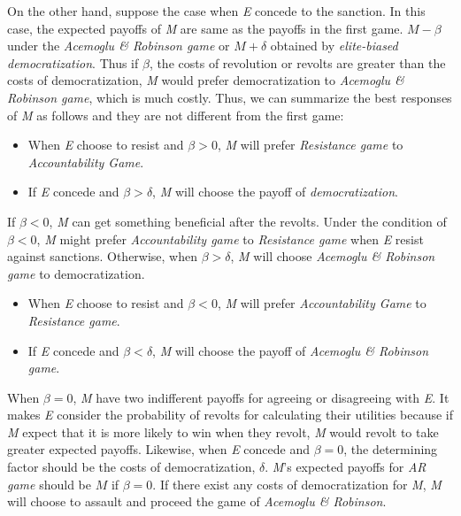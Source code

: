 \documentclass[11pt, letterpage, titlepage]{article}
\begin{document}
On the other hand, suppose the case when \textit{E} concede to the sanction. In this case, the expected payoffs of \textit{M} are same as the payoffs in the first game. $M-\beta$ under the \textit{Acemoglu \& Robinson game} or $M + \delta$ obtained by \textit{elite-biased democratization}. Thus if $\beta$, the costs of revolution or revolts are greater than the costs of democratization, \textit{M} would prefer democratization to \textit{Acemoglu \& Robinson game}, which is much costly. Thus, we can summarize the best responses of \textit{M} as follows and they are not different from the first game:
	
\begin{itemize}
	\item When \textit{E} choose to resist and $\beta > 0$, \textit{M} will prefer \textit{Resistance game} to \textit{Accountability Game}.
	\item If \textit{E} concede and $\beta > \delta$, \textit{M} will choose the payoff of \textit{democratization}.
\end{itemize}
	
If $\beta < 0$, \textit{M} can get something beneficial after the revolts. Under the condition of $\beta < 0$, \textit{M} might prefer \textit{Accountability game} to \textit{Resistance game} when \textit{E} resist against sanctions. Otherwise, when $\beta > \delta$, \textit{M} will choose \textit{Acemoglu \& Robinson game} to democratization. 

\begin{itemize}
	\item When \textit{E} choose to resist and $\beta < 0$, \textit{M} will prefer \textit{Accountability Game} to \textit{Resistance game}.
	\item If \textit{E} concede and $\beta < \delta$, \textit{M} will choose the payoff of \textit{Acemoglu \& Robinson game}.
\end{itemize}
	
When $\beta = 0$, \textit{M} have two indifferent payoffs for agreeing or disagreeing with \textit{E}. It makes \textit{E} consider the probability of revolts for calculating their utilities because if \textit{M} expect that it is more likely to win when they revolt, \textit{M} would revolt to take greater expected payoffs.    Likewise, when \textit{E} concede and $\beta = 0$, the determining factor should be the costs of democratization, $\delta$. \textit{M}'s expected payoffs for \textit{AR game} should be $M$ if $\beta = 0$. If there exist any costs of democratization for \textit{M}, \textit{M} will choose to assault and proceed the game of \textit{Acemoglu \& Robinson}. 
	
\end{document}
